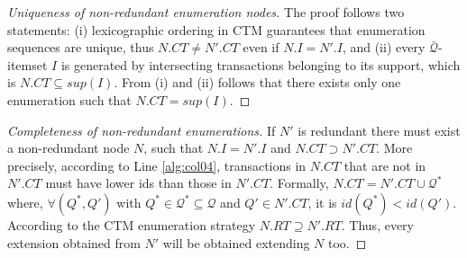 \documentclass[
]{ceurart}
\newtheorem{proof}{Proof}
\begin{document}
\begin{proof}[Uniqueness of non-redundant enumeration nodes]\label{ap:t2}
The proof follows two statements: (i) lexicographic ordering in CTM guarantees that enumeration sequences are unique, thus  $N.CT \neq N'.CT$ even if $N.I=N'.I$, and (ii) every $\bar{\mathcal{Q}}$-itemset $I$ is generated by intersecting transactions belonging to its support, which is $N.CT \subseteq sup(I)$.
From (i) and (ii) follows that there exists only one enumeration such that $N.CT = sup(I)$.
\end{proof}

\begin{proof}[Completeness of non-redundant enumerations]\label{ap:t3}
If $N'$ is redundant there must exist a non-redundant node $N$, such that $N.I=N'.I$ and  $N.CT \supset N'.CT$.
More precisely, according to  Line \ref{alg:col04}, transactions in $N.CT$ that are not in $N'.CT$ must have lower ids than those in $N'.CT$.
Formally, $N.CT = N'.CT \cup \mathcal{Q}^*$ where, $ \forall (Q^*,Q')$ with $Q^* \in \mathcal{Q}^* \subseteq \mathcal{Q}$ and $Q' \in N'.CT$, it is $id(Q^*)<id(Q')$.
According to the CTM enumeration strategy $N.RT \supseteq N'.RT$.
Thus, every extension obtained from $N'$ will be obtained extending $N$ too.
\end{proof}

\balance

\end{document}
